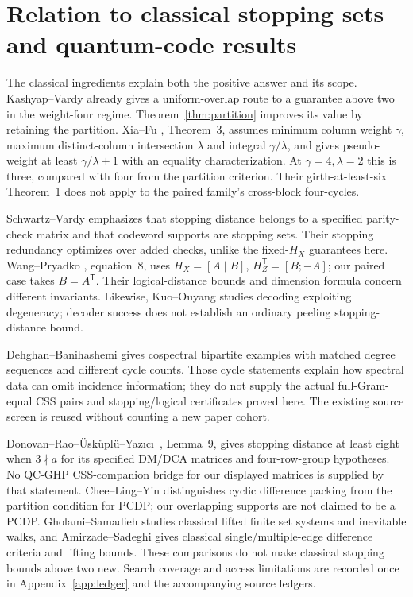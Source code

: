 \documentclass[11pt]{article}
\begin{document}
\section{Relation to classical stopping sets and quantum-code results}
\label{sec:related}
The classical ingredients explain both the positive answer and its scope.
Kashyap--Vardy \cite{ref2} already gives a uniform-overlap route to a guarantee above
two in the weight-four regime. Theorem~\ref{thm:partition} improves its value
by retaining the partition. Xia--Fu \cite{ref8}, Theorem~3, assumes minimum column
weight $\gamma$, maximum distinct-column intersection $\lambda$ and integral
$\gamma/\lambda$, and gives pseudo-weight at least $\gamma/\lambda+1$ with an
equality characterization. At $\gamma=4,\lambda=2$ this is three, compared
with four from the partition criterion. Their girth-at-least-six Theorem~1
does not apply to the paired family's cross-block four-cycles.

Schwartz--Vardy \cite{ref5} emphasizes that stopping distance belongs to a specified
parity-check matrix and that codeword supports are stopping sets. Their
stopping redundancy optimizes over added checks, unlike the fixed-$H_X$
guarantees here. Wang--Pryadko \cite{ref4}, equation~8, uses
$H_X=[A\mid B]$, $H_Z^{\mathsf T}=[B;-A]$; our paired case takes
$B=A^{\mathsf T}$. Their logical-distance bounds and dimension formula concern
different invariants. Likewise, Kuo--Ouyang \cite{ref6} studies decoding exploiting
degeneracy; decoder success does not establish an ordinary peeling
stopping-distance bound.

Dehghan--Banihashemi \cite{ref9} gives cospectral bipartite examples with matched
degree sequences and different cycle counts. Those cycle statements explain
how spectral data can omit incidence information; they do not supply the
actual full-Gram-equal CSS pairs and stopping/logical certificates proved here.
The existing source screen is reused without counting a new paper cohort.

Donovan--Rao--\"Usk\"upl\"u--Yaz\i c\i\ \cite{ref10}, Lemma~9, gives stopping
distance at least eight when $3\nmid a$ for its specified DM/DCA matrices and
four-row-group hypotheses. No QC-GHP CSS-companion bridge for our displayed
matrices is supplied by that statement. Chee--Ling--Yin \cite{ref11} distinguishes
cyclic difference packing from the partition condition for PCDP; our
overlapping supports are not claimed to be a PCDP. Gholami--Samadieh \cite{ref12}
studies classical lifted finite set systems and inevitable walks, and
Amirzade--Sadeghi \cite{ref13} gives classical single/multiple-edge difference criteria
and lifting bounds. These comparisons do not make classical stopping bounds
above two new. Search coverage and access limitations are recorded once in
Appendix~\ref{app:ledger} and the accompanying source ledgers.
\end{document}
